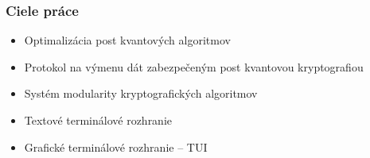 \documentclass[%
  14pt,       				%
	t,                  %
	aspectratio=1610,   %
	unicode,						%
]{beamer}				    	%
\begin{document}
\disablenavigationsymbols


\maketitle
\newcommand{\npm}[2]{{#1}\,$\pm\,{#2}\%$}

\begin{frame}[c]
	\frametitle{Ciele práce}
	\large{\begin{itemize}
			\item Optimalizácia post kvantových algoritmov
			\item Protokol na výmenu dát zabezpečeným post kvantovou kryptografiou
			\item Systém modularity kryptografických algoritmov
			\item Textové terminálové rozhranie
			\item Grafické terminálové rozhranie -- TUI
		\end{itemize}
	}
\end{frame}


\end{document}

